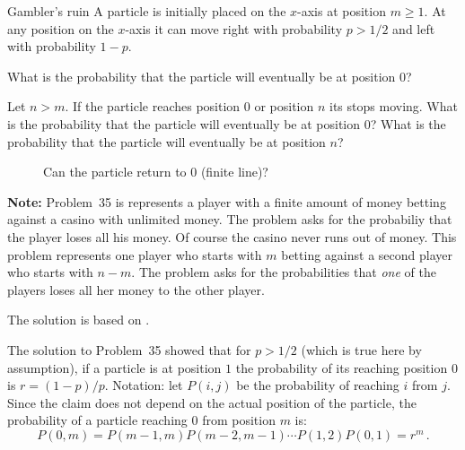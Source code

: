 \begin{prob}{Gambler's ruin}
A particle is initially placed on the $x$-axis at position $m\geq 1$. At any position on the $x$-axis it can move right with probability $p>1/2$ and left with probability $1-p$.

 What is the probability that the particle will eventually be at position $0$?

 Let $n>m$. If the particle reaches position $0$ or position $n$ its stops moving. What is the probability that the particle will eventually be at position $0$? What is the probability that the particle will eventually be at position $n$?
\begin{figure}[tb]
\begin{center}
\end{center}
\caption{Can the particle return to $0$ (finite line)?}\label{f.ruin3}
\end{figure}

\textbf{Note:} Problem~35 is represents a player with a finite amount of money betting against a casino with unlimited money. The problem asks for the probabiliy that the player loses all his money. Of course the casino never runs out of money. This problem represents one player who starts with $m$ betting against a second player who starts with $n-m$. The problem asks for the probabilities that \emph{one} of the players loses all her money to the other player.

\end{prob}

\solution{}

The solution is based on \cite[Chapter~2, Example~4m]{ross}.

 The solution to Problem~35 showed that for $p>1/2$ (which is true here by assumption), if a particle is at position $1$ the probability of its reaching position $0$ is $r=(1-p)/p$. Notation: let $P(i,j)$ be the probability of reaching $i$ from $j$. Since the claim does not depend on the actual position of the particle, the probability of a particle reaching $0$ from position $m$ is:
\begin{equation}
P(0,m)=P(m-1,m)P(m-2,m-1)\cdots P(1,2)P(0,1)=r^m\,.
\end{equation}

